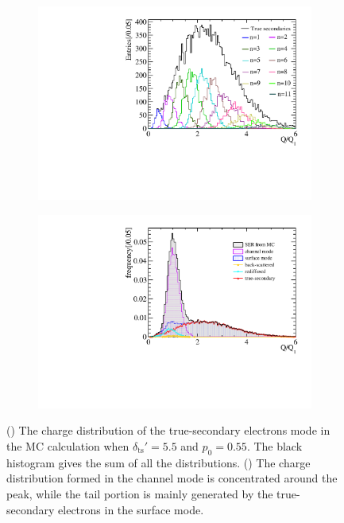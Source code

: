 \begin{figure}[!htbp]
	\begin{subfigure}{0.47\linewidth}
		\includegraphics[width=\textwidth]{PMTRelated/GTmodel/true_all.pdf}
		\caption{}
		\label{fig:true_n}
	\end{subfigure}
	\hfill
	\begin{subfigure}{0.47\linewidth}
		\includegraphics[width=\textwidth]{PMTRelated/GTmodel/allmode.pdf}
		\caption{}
		\label{fig:allmode}
	\end{subfigure}
	\caption{() The charge distribution of the true-secondary electrons mode
		in the MC calculation when $\delta_{\mathrm{ts}}'=5.5$ and $p_0=0.55$.
		The black histogram gives the sum of all the distributions.
		() The charge distribution formed in the channel mode is concentrated around the peak,
		while the tail portion is mainly generated by the true-secondary electrons in the surface mode.}
\end{figure}

